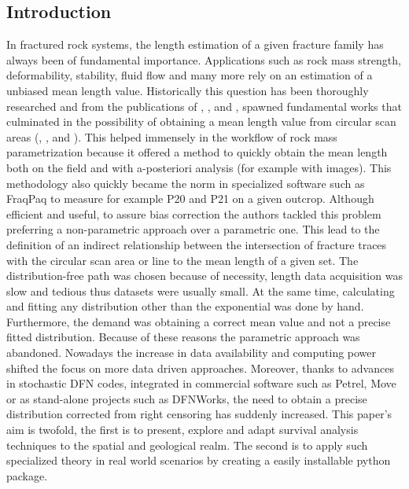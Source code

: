 \documentclass[11pt]{article}
\begin{document}
	\begin{multicols}{2}
			\section{Introduction}
				In fractured rock systems, the length estimation of a given fracture family has always been of fundamental importance. Applications such as rock mass strength, deformability, stability, fluid flow and many more rely on an estimation of a unbiased mean length value. Historically this question has been thoroughly researched and from the publications of \cite{terzaghiSourcesErrorJoint1965}, \cite{warburtonStereologicalInterpretationJoint1980}, \cite{pahlEstimatingMeanLength1981} and \cite{laslettSurvivalCurveMonotone1982}, spawned fundamental works that culminated in the possibility of obtaining a mean length value from circular scan areas (\cite{mauldonEstimatingMeanFracture1998}, \cite{zhangEstimatingMeanTrace1998}, \cite{mauldonCircularScanlinesCircular2001} and \cite{rohrbaughEstimatingFractureTrace2002}). This helped immensely in the workflow of rock mass parametrization because it offered a method to quickly obtain the mean length both on the field and with a-posteriori analysis (for example with images). This methodology also quickly became the norm in specialized software such as FraqPaq \parencite{healyFracPaQMATLABToolbox2017} to measure for example P20 and P21 on a given outcrop. 
				Although efficient and useful, to assure bias correction the authors tackled this problem preferring a non-parametric approach over a parametric one. This lead to the definition of an indirect relationship between the intersection of fracture traces with the circular scan area or line to the mean length of a given set. The distribution-free path was chosen because of necessity, length data acquisition was slow and tedious thus datasets were usually small. At the same time, calculating and fitting any distribution other than the exponential \parencite{baecherProgressivelyCensoredSampling1980} was done by hand. Furthermore, the demand was obtaining a correct mean value and not a precise fitted distribution. Because of these reasons the parametric approach was abandoned.
				Nowadays the increase in data availability and computing power shifted the focus on more data driven approaches. Moreover, thanks to advances in stochastic DFN codes, integrated in commercial software such as Petrel, Move or as stand-alone projects such as DFNWorks, the need to obtain a precise distribution corrected from right censoring has suddenly increased.
				This paper's aim is twofold, the first is to present, explore and adapt survival analysis techniques to the spatial and geological realm. The second is to apply such specialized theory in real world scenarios by creating a easily installable python package.
				
				
	
	\newpage
	\printbibliography
	\end{multicols}
	
\end{document}
